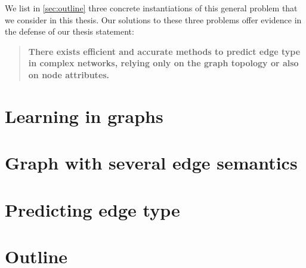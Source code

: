 We list in \autoref{sec:outline} three concrete instantiations of this general problem that we
consider in this thesis. Our solutions to these three problems offer evidence in the defense of our
thesis statement:
\begin{quote}
  \bf
  There exists efficient and accurate methods to predict edge type in complex networks, relying
  only on the graph topology or also on node attributes.
\end{quote}

\section{Learning in graphs}
\label{sec:learning_in_graphs}


\section{Graph with several edge semantics}
\label{sec:edge_semantics}


\section{Predicting edge type}
\label{sec:predicting_edge_type}


\section{Outline}
\label{sec:outline}


